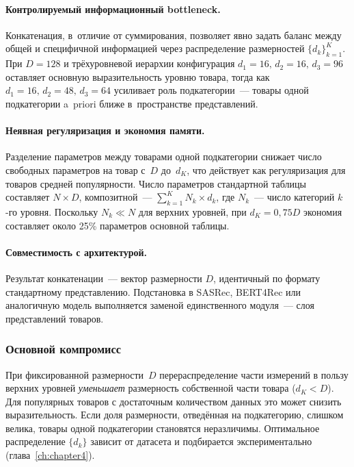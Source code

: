 \paragraph{Контролируемый информационный bottleneck.}
Конкатенация, в~отличие от суммирования, позволяет явно задать баланс между общей и специфичной
информацией через распределение размерностей $\{d_k\}_{k=1}^K$. При $D = 128$ и трёхуровневой
иерархии конфигурация $d_1 = 16,\, d_2 = 16,\, d_3 = 96$ оставляет основную выразительность
уровню товара, тогда как $d_1 = 16,\, d_2 = 48,\, d_3 = 64$ усиливает роль подкатегории~---
товары одной подкатегории a~priori ближе в~пространстве представлений.

\paragraph{Неявная регуляризация и экономия памяти.}
Разделение параметров между товарами одной подкатегории снижает число свободных параметров
на товар с~$D$ до~$d_K$, что действует как регуляризация для товаров средней популярности.
Число параметров стандартной таблицы составляет $N \times D$, композитной~---
$\sum_{k=1}^{K} N_k \times d_k$, где $N_k$~--- число категорий $k$-го уровня. Поскольку
$N_k \ll N$ для верхних уровней, при $d_K = 0{,}75 D$ экономия составляет около 25\%
параметров основной таблицы.

\paragraph{Совместимость с архитектурой.}
Результат конкатенации~--- вектор размерности $D$, идентичный по формату стандартному
представлению. Подстановка в SASRec, BERT4Rec или аналогичную модель выполняется заменой
единственного модуля~--- слоя представлений товаров.

\subsubsection{Основной компромисс}

При фиксированной размерности~$D$ перераспределение части измерений в пользу верхних уровней
\emph{уменьшает} размерность собственной части товара ($d_K < D$). Для популярных товаров с
достаточным количеством данных это может снизить выразительность. Если доля размерности,
отведённая на подкатегорию, слишком велика, товары одной подкатегории становятся неразличимы.
Оптимальное распределение $\{d_k\}$ зависит от датасета и подбирается экспериментально
(глава~\ref{ch:chapter4}).

